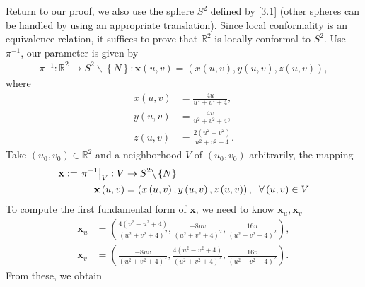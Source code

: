 \documentclass[a4paper]{article}
\numberwithin{equation}{section}
\begin{document}
Return to our proof, we also use the sphere $S^2$ defined by \eqref{3.1} (other spheres can be handled by using an appropriate translation). Since local conformality is an equivalence relation, it suffices to prove that $\mathbb{R}^2$ is locally conformal to $S^2$. Use $\pi ^{-1}$, our parameter is given by 
\begin{align}
{\pi ^{ - 1}}:{\mathbb{R}^2} \to {S^2}\backslash \left\{ N \right\}:\mathbf{x}\left( {u,v} \right) = \left( {x\left( {u,v} \right),y\left( {u,v} \right),z\left( {u,v} \right)} \right),
\end{align}
where
\begin{align}
x\left( {u,v} \right) &= \frac{{4u}}{{{u^2} + {v^2} + 4}},\\
y\left( {u,v} \right) &= \frac{{4v}}{{{u^2} + {v^2} + 4}},\\
z\left( {u,v} \right) &= \frac{{2\left( {{u^2} + {v^2}} \right)}}{{{u^2} + {v^2} + 4}}.
\end{align}
Take $\left(u_0,v_0\right)\in \mathbb{R}^2$ and a neighborhood $V$ of $\left(u_0,v_0\right)$ arbitrarily, the mapping 
\begin{align}
\mathbf{x}:={\left. {{\pi ^{ - 1}}} \right|_V}:V &\to {S^2}\backslash \left\{ N \right\}\\
\mathbf{x}\left( {u,v} \right) &= \left( {x\left( {u,v} \right),y\left( {u,v} \right),z\left( {u,v} \right)} \right),\hspace{0.2cm}\forall \left( {u,v} \right) \in V
\end{align}
To compute the first fundamental form of $\mathbf{x}$, we need to know $\mathbf{x}_u,\mathbf{x}_v$
\begin{align}
{\mathbf{x}_u} &= \left( {\frac{{4\left( {{v^2} - {u^2} + 4} \right)}}{{{{\left( {{u^2} + {v^2} + 4} \right)}^2}}},\frac{{ - 8uv}}{{{{\left( {{u^2} + {v^2} + 4} \right)}^2}}},\frac{{16u}}{{{{\left( {{u^2} + {v^2} + 4} \right)}^2}}}} \right),\\
{\mathbf{x}_v} &= \left( {\frac{{ - 8uv}}{{{{\left( {{u^2} + {v^2} + 4} \right)}^2}}},\frac{{4\left( {{u^2} - {v^2} + 4} \right)}}{{{{\left( {{u^2} + {v^2} + 4} \right)}^2}}},\frac{{16v}}{{{{\left( {{u^2} + {v^2} + 4} \right)}^2}}}} \right).
\end{align}
From these, we obtain
\end{document}
